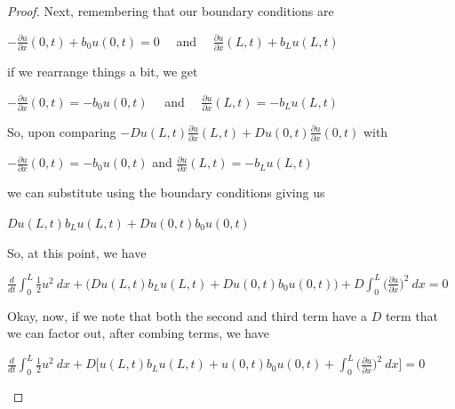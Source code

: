 \documentclass[12pt, executivepaper]{article}
\begin{document}
\begin{flushleft}
\begin{proof}
Next, remembering that our boundary conditions are

\begin{center}

$-\frac{\partial u}{\partial x}(0,t) + b_{0}u(0,t)=0 \quad$ and $\quad \frac{\partial u}{\partial x}(L,t) + b_{L} u(L,t)$

\end{center}

if we rearrange things a bit, we get

\begin{center}

$-\frac{\partial u}{\partial x}(0,t)=-b_{0}u(0,t) \quad$ and $\quad \frac{\partial u}{\partial x}(L,t)=-b_{L} u(L,t)$

\end{center}

So, upon comparing $-Du(L,t) \frac{\partial u}{\partial x}(L,t) + Du(0,t) \frac{\partial u}{\partial x}(0,t)$ with 

\begin{center}

$-\frac{\partial u}{\partial x}(0,t)=-b_{0}u(0,t)$ and $\frac{\partial u}{\partial x}(L,t)=-b_{L} u(L,t)$

\end{center}

we can substitute using the boundary conditions giving us

\begin{center}

$Du(L,t) b_{L} u(L,t) + Du(0,t) b_{0}u(0,t)$

\end{center}

So, at this point, we have

\begin{center}

$\frac{d}{dt}\int_{0}^{L} \frac{1}{2} u^2 \ dx + \bigg(Du(L,t) b_{L} u(L,t) + Du(0,t) b_{0}u(0,t)\bigg)+ D \int_{0}^{L} \bigg(\frac{\partial u}{\partial x}\bigg)^2 \ dx=0$

\end{center}

Okay, now, if we note that both the second and third term have a $D$ term that we can factor out, after combing terms, we have

\begin{center}

$\frac{d}{dt}\int_{0}^{L} \frac{1}{2} u^2 \ dx + D\bigg[u(L,t) b_{L} u(L,t) + u(0,t) b_{0}u(0,t) + \int_{0}^{L} \bigg(\frac{\partial u}{\partial x}\bigg)^2 \ dx\bigg]=0$


\end{center}
\end{proof}
\end{flushleft}
\end{document}

